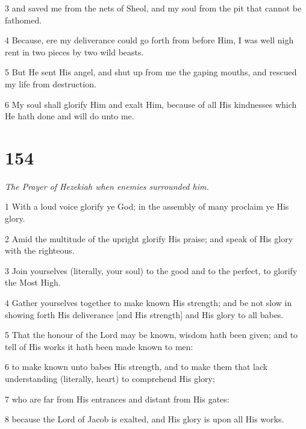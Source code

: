 \par 3 and saved me from the nets of Sheol, and my soul from the pit that cannot be fathomed. 

\par 4 Because, ere my deliverance could go forth from before Him, I was well nigh rent in two pieces by two wild beasts. 

\par 5 But He sent His angel, and shut up from me the gaping mouths, and rescued my life from destruction. 

\par 6 My soul shall glorify Him and exalt Him, because of all His kindnesses which He hath done and will do unto me.

\chapter{154}

\par \textit{The Prayer of Hezekiah when enemies surrounded him.}

\par 1 With a loud voice glorify ye God; in the assembly of many proclaim ye His glory. 

\par 2 Amid the multitude of the upright glorify His praise; and speak of His glory with the righteous. 

\par 3 Join yourselves (literally, your soul) to the good and to the perfect, to glorify the Most High. 

\par 4 Gather yourselves together to make known His strength; and be not slow in showing forth His deliverance [and His strength] and His glory to all babes. 

\par 5 That the honour of the Lord may be known, wisdom hath been given; and to tell of His works it hath been made known to men: 

\par 6 to make known unto babes His strength, and to make them that lack understanding (literally, heart) to comprehend His glory; 

\par 7 who are far from His entrances and distant from His gates: 

\par 8 because the Lord of Jacob is exalted, and His glory is upon all His works. 


